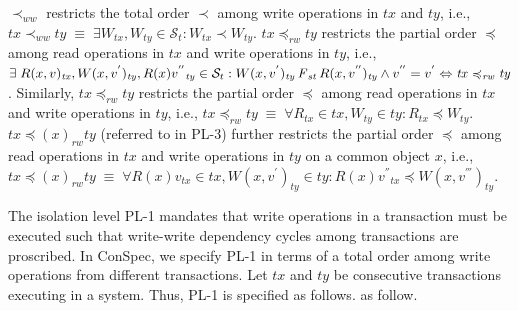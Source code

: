 \documentclass[acmlarge, ,11pt]{acmart}
\begin{document}
  $\prec_{\mathit{ww}}$ restricts the total order $\prec$ among write operations in $\mathit{tx}$ and $\mathit{ty}$, i.e., $\mathit{tx} \prec_{\mathit{ww}} \mathit{ty}  \;  \equiv \; \exists {\mathit{W}}_ \mathit{tx}, {\mathit{W}}_ \mathit{ty} \in \mathcal{S}_t: {\mathit{W}}_ \mathit{tx} \prec {\mathit{W}}_ \mathit{ty}$. $\mathit{tx} \preccurlyeq_{\mathit{rw}} \mathit{ty}$ restricts the partial order $\preccurlyeq$ among read operations in $\mathit{tx}$ and write operations in $\mathit{ty}$, i.e., $\exists \; R(x,v)_{\mathit{tx}}, W(x,v^{'})_{\mathit{ty}}, R(x){v^{''}}_{\mathit{ty}} \in  \mathcal{S}_t:  W(x,v^{'})_{\mathit{ty}} \operatorname{\it F}_\mathit{st} R(x,v^{''})_{\mathit{ty}} \wedge  v^{''} = v^{'}  \Leftrightarrow \mathit{tx} \preccurlyeq_{\mathit{rw}} \mathit{ty}$.  Similarly,  $\mathit{tx} \preccurlyeq_{\mathit{rw}} \mathit{ty}$ restricts the partial order $\preccurlyeq$ among read operations in $\mathit{tx}$ and write operations in $\mathit{ty}$, i.e., $\mathit{tx} \preccurlyeq_{\mathit{rw}} \mathit{ty}  \;  \equiv \; \forall {\mathit{R}}_ \mathit{tx} \in \mathit{tx}, {\mathit{W}}_ \mathit{ty} \in \mathit{ty}: {\mathit{R}}_ \mathit{tx} \preccurlyeq {\mathit{W}}_ \mathit{ty}$.  $\mathit{tx} \preccurlyeq(x)_{\mathit{rw}} \mathit{ty}$  (referred to in PL-3) further restricts the partial order $\preccurlyeq$ among read operations in $\mathit{tx}$ and write operations in $\mathit{ty}$ on a common object $x$, i.e., $\mathit{tx} \preccurlyeq(x)_{\mathit{rw}} \mathit{ty}  \;  \equiv \; \forall {\mathit{R}}(x){v}_ \mathit{tx} \in \mathit{tx}, {\mathit{W}}(x,v^{'})_ \mathit{ty} \in \mathit{ty}: {\mathit{R}}(x){v^{''}}_ \mathit{tx} \preccurlyeq {\mathit{W}}(x,v^{'''})_ \mathit{ty}$. 
  \par The isolation level PL-1 mandates that write operations in  a transaction must be executed such that write-write
 dependency cycles among transactions are proscribed. In ConSpec, we specify PL-1 in terms of a total order among write operations from different transactions. Let $\mathit{tx}$ and $\mathit{ty}$  be consecutive transactions executing in a system.  Thus, PL-1 is specified as follows. 
 as follow.
\end{document}
